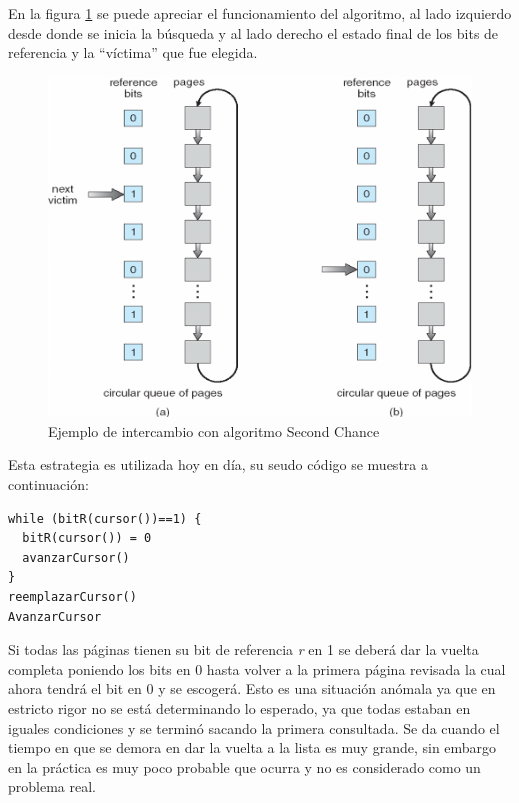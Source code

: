 En la figura \ref{fig:swap_secondchance} se puede apreciar el funcionamiento del
algoritmo, al lado izquierdo desde donde se inicia la búsqueda y al lado derecho
el estado final de los bits de referencia y la ``víctima'' que fue elegida.

\begin{figure}[htbp]
\centering
\includegraphics[scale=0.6]{img/C07_memoria/second_chance.png}
\caption{Ejemplo de intercambio con algoritmo Second Chance}
\label{fig:swap_secondchance}
\end{figure}

Esta estrategia es utilizada hoy en día, su seudo código se muestra a continuación:

\begin{verbatim}
while (bitR(cursor())==1) {
  bitR(cursor()) = 0
  avanzarCursor()
}
reemplazarCursor()
AvanzarCursor
\end{verbatim}

Si todas las páginas tienen su bit de referencia \textit{r} en 1 se deberá dar la vuelta completa poniendo los bits en 0 hasta volver a la primera página revisada la cual ahora tendrá el bit en 0 y se escogerá. Esto es una situación anómala ya que en estricto rigor no se está determinando lo esperado, ya que todas estaban en iguales condiciones y se terminó sacando la primera consultada. Se da cuando el tiempo en que se demora en dar la vuelta a la lista es muy grande, sin embargo en la práctica es muy poco probable que ocurra y no es considerado como un problema real.

